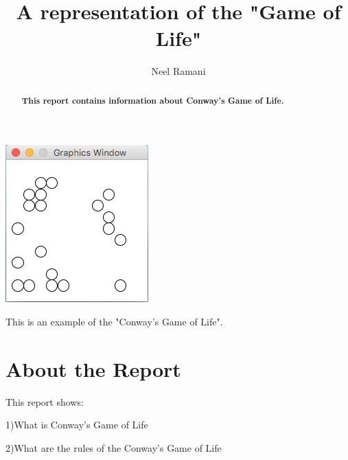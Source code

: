 \documentclass{tufte-handout}
\title{A representation of the "Game of Life"}
\author[EF Academy]{Neel Ramani}
\begin{document}
\maketitle%
\begin{marginfigure}%
  \includegraphics[width=\linewidth]{gol.png}
  \caption{This is an example of the "Conway's Game of Life".}
  \label{fig:marginfig}
\end{marginfigure}
\begin{abstract}
\noindent
\textbf{This report contains information about Conway's Game of Life.}
\end{abstract}

\normalsize
\sffamily


\vspace{1cm}
\section{About the Report}

This report shows:

	1){\color{red}What is} Conway's Game of Life
	
	2)What are the {\color{red}rules} of the Conway's Game of Life
	
\end{document}
